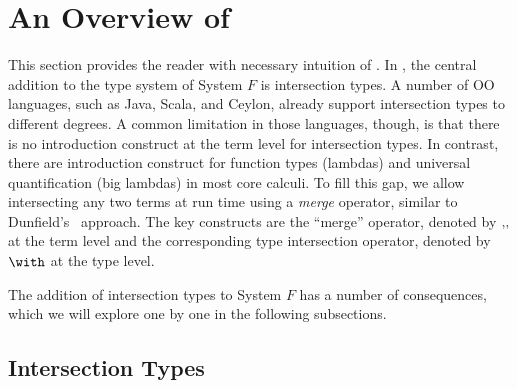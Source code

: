 \section{An Overview of \name}


This section provides the reader with necessary intuition of \name. In \name,
the central addition to the type system of System $ F $ is intersection types.
A number of OO languages, such as Java, Scala, and
Ceylon, already support intersection types to different degrees. A
common limitation in those languages, though, is that there is no introduction
construct at the term level for intersection types. In contrast, there are
introduction construct for function types (lambdas) and universal quantification
(big lambdas) in most core calculi. To fill this gap, we allow intersecting any
two terms at run time using a \emph{merge} operator, similar to
Dunfield's~\cite{dunfield2014elaborating} approach. The key constructs are the
``merge'' operator, denoted by $ ,\!, $ at the term level and the
corresponding type intersection operator, denoted by $ \Intersect $ at the type
level.

The addition of intersection types to System $ F $ has a number of consequences,
which we will explore one by one in the following subsections.

\subsection{Intersection Types}


